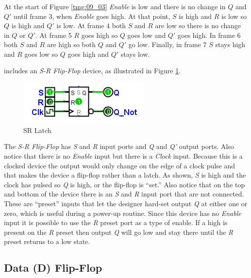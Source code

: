 At the start of Figure \ref{tmg:09_03} \emph{Enable} is low and there is no change in $ Q $ and $ Q' $ until frame 3, when \emph{Enable} goes high. At that point, $ S $ is high and $ R $ is low so $ Q $ is high and $ Q' $ is low. At frame $ 4 $ both $ S $ and $ R $ are low so there is no change in $ Q $ or $ Q' $. At frame 5 $ R $ goes high so $ Q $ goes low and $ Q' $ goes high. In frame $ 6 $ both $ S $ and $ R $ are high so both $ Q $ and $ Q' $ go low. Finally, in frame $ 7 $ $ S $ stays high and $ R $ goes low so $ Q $ goes high and $ Q' $ stays low.

\Le includes an \emph{S-R Flip-Flop} device, as illustrated in Figure \ref{fig:09_02}. 

\begin{figure}[H]
	\centering
	\includegraphics[width=\maxwidth{.95\linewidth}]{gfx/09_02}
	\caption{SR Latch}
	\label{fig:09_02}
\end{figure}

The \emph{S-R Flip-Flop} has \emph{S} and \emph{R} input ports and \emph{Q} and \emph{Q'} output ports. Also notice that there is no \emph{Enable} input but there is a \emph{Clock} input. Because this is a clocked device the output would only change on the edge of a clock pulse and that makes the device a flip-flop rather than a latch. As shown, \emph{S} is high and the clock has pulsed so \emph{Q} is high, or the flip-flop is ``set.'' Also notice that on the top and bottom of the device there is an \emph{S} and \emph{R} input port that are not connected. These are ``preset'' inputs that let the designer hard-set output \emph{Q} at either one or zero, which is useful during a power-up routine. Since this device has no \emph{Enable} input it is possible to use the \emph{R} preset port as a type of enable. If a high is present on the \emph{R} preset then output \emph{Q} will go low and stay there until the \emph{R} preset returns to a low state.

\subsection{Data (D) Flip-Flop}
\label{SL:subsec:data_latch}

